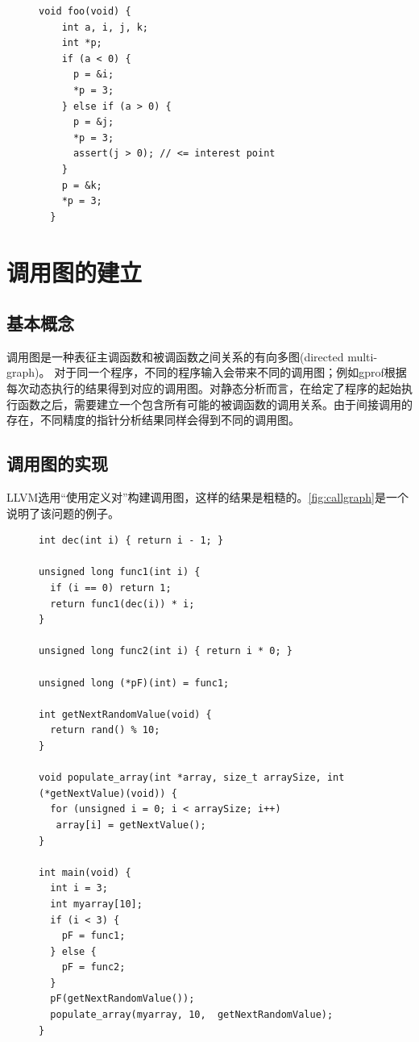 \begin{figure}[t]
\begin{center}
\begin{lstlisting}[language={[ANSI]C}]
  void foo(void) {
    int a, i, j, k;
    int *p;
    if (a < 0) {
      p = &i;
      *p = 3;
    } else if (a > 0) {
      p = &j;
      *p = 3;
      assert(j > 0); // <= interest point
    }
    p = &k;
    *p = 3;
  }
\end{lstlisting}
\end{center}
\end{figure}

\section{调用图的建立}
\label{sec:callgraph}

\subsection{基本概念}
\label{subsec:cg_basic}
调用图是一种表征主调函数和被调函数之间关系的有向多图(directed multi-graph)。 对于同一个程序，不同的程序输入会带来不同的调用图；例如gprof根据每次动态执行的结果得到对应的调用图。对静态分析而言，在给定了程序的起始执行函数之后，需要建立一个包含所有可能的被调函数的调用关系。由于间接调用的存在，不同精度的指针分析结果同样会得到不同的调用图。

\subsection{调用图的实现}
\label{subsec:cg_impl}

LLVM选用“使用定义对”构建调用图，这样的结果是粗糙的。\autoref{fig:callgraph}是一个说明了该问题的例子。
\begin{figure}[t]
\begin{center}
\begin{lstlisting}[language={[ANSI]C}]
int dec(int i) { return i - 1; }

unsigned long func1(int i) {
  if (i == 0) return 1;
  return func1(dec(i)) * i;
}

unsigned long func2(int i) { return i * 0; }

unsigned long (*pF)(int) = func1;

int getNextRandomValue(void) { 
  return rand() % 10; 
}

void populate_array(int *array, size_t arraySize, int (*getNextValue)(void)) {
  for (unsigned i = 0; i < arraySize; i++)
   array[i] = getNextValue();
}

int main(void) {
  int i = 3;
  int myarray[10];
  if (i < 3) {
    pF = func1;
  } else {
    pF = func2;
  }
  pF(getNextRandomValue());
  populate_array(myarray, 10,  getNextRandomValue);
}
\end{lstlisting}
\end{center}
\end{figure}

